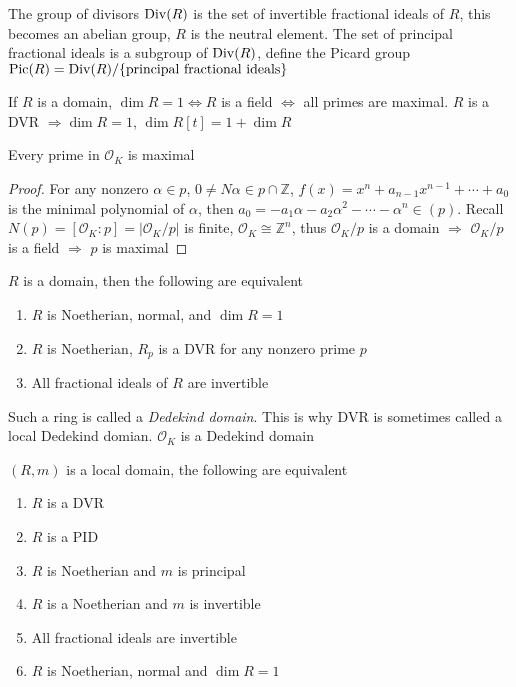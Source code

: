 \documentclass[../main.tex]{subfiles}
\begin{document}
\begin{definition}
 The group of divisors $\operatorname{Div}(R)$ is the set of invertible fractional ideals of $R$, this becomes an abelian group, $R$ is the neutral element. The set of principal fractional ideals is a subgroup of $\operatorname{Div}(R)$, define the Picard group $\operatorname{Pic}(R)=\operatorname{Div}(R)/\{\text{principal fractional ideals}\}$
\end{definition}

\begin{proposition}
If $R$ is a domain, $\dim R=1\Leftrightarrow R$ is a field $\Leftrightarrow$ all primes are maximal. $R$ is a DVR $\Rightarrow\dim R=1$, $\dim R[t]=1+\dim R$
\end{proposition}

\begin{proposition}
Every prime in $\mathcal O_K$ is maximal
\end{proposition}

\begin{proof}
For any nonzero $\alpha\in p$, $0\neq N\alpha\in p\cap\mathbb Z$, $f(x)=x^n+a_{n-1}x^{n-1}+\cdots+a_0$ is the minimal polynomial of $\alpha$, then $a_0=-a_1\alpha-a_2\alpha^2-\cdots-\alpha^n\in(p)$. Recall $N(p)=[\mathcal O_K:p]=|\mathcal O_K/p|$ is finite, $\mathcal O_K\cong\mathbb Z^n$, thus $\mathcal O_K/p$ is a domain $\Rightarrow$ $\mathcal O_K/p$ is a field $\Rightarrow$ $p$ is maximal
\end{proof}

\begin{theorem}
$R$ is a domain, then the following are equivalent
\begin{enumerate}
\item $R$ is Noetherian, normal, and $\dim R=1$
\item $R$ is Noetherian, $R_p$ is a DVR for any nonzero prime $p$
\item All fractional ideals of $R$ are invertible
\end{enumerate}
Such a ring is called a \textit{Dedekind domain}. This is why DVR is sometimes called a local Dedekind domian. $\mathcal O_K$ is a Dedekind domain
\end{theorem}

\begin{theorem}
$(R,m)$ is a local domain, the following are equivalent
\begin{enumerate}[label=(\arabic*)]
\item $R$ is a DVR
\item $R$ is a PID
\item $R$ is Noetherian and $m$ is principal
\item $R$ is a Noetherian and $m$ is invertible
\item All fractional ideals are invertible
\item $R$ is Noetherian, normal and $\dim R=1$
\end{enumerate}
\end{theorem}
\end{document}
